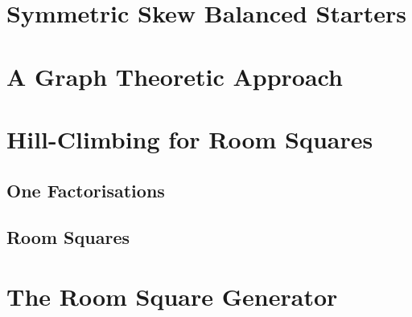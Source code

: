 \documentclass[a4paper, draft]{book}
\begin{document}
\chapter{Symmetric Skew Balanced Starters}
  \label{ch:symmetric-skew-balanced-starters}
  

\chapter{A Graph Theoretic Approach}
  \label{ch:graph-theoretic}
  

\chapter{Hill-Climbing for Room Squares}
  \label{ch:hill-climbing}
  
  \section{One Factorisations}
  
  \section{Room Squares}
  

\appendix
\chapter{The Room Square Generator}
  \label{ch:room-square-generator}
  

\backmatter
\printbibliography[title=References]
\end{document}
